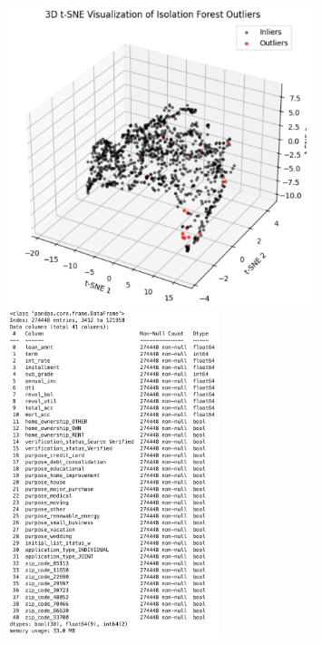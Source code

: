 \documentclass[
  a4paper,
  DIV=11,
  numbers=noendperiod]{scrreprt}
\begin{document}
\begin{tcolorbox}
\begin{figure}[H]
\begin{minipage}{0.50\linewidth}
\begin{center}
\includegraphics[width=0.8\textwidth,height=\textheight]{image/ml7-1.png}
\end{center}
\end{minipage}%
%
\begin{minipage}{0.50\linewidth}
\begin{center}
\includegraphics[width=0.55\textwidth,height=\textheight]{image/ml8_finaldata.png}
\end{center}
\end{minipage}%

\end{figure}%

\end{tcolorbox}
\end{document}
